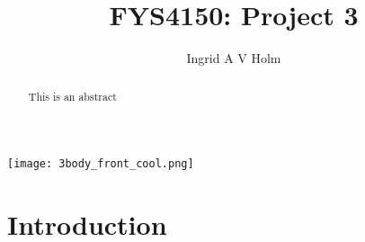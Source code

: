 \documentclass[11pt]{article}
\begin{document}
\title{FYS4150: Project 3}
\author{Ingrid A V Holm}
\maketitle

\begin{center}
\texttt{[image: 3body\_front\_cool.png]}
\end{center}


\pagebreak

\begin{abstract}
This is an abstract
\end{abstract}






\section{Introduction}
\end{document}
